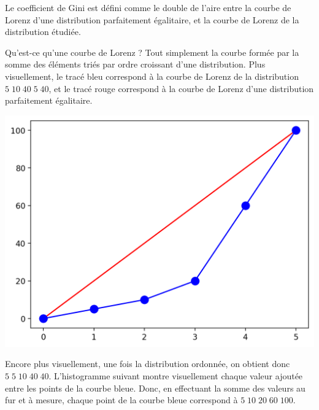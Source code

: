 \documentclass[11pt,a4paper]{article}
\begin{document}
\bigskip

Le coefficient de Gini est défini comme le double de l'aire entre la courbe de Lorenz d'une distribution parfaitement égalitaire, et la courbe de Lorenz de la distribution étudiée.

Qu'est-ce qu'une courbe de Lorenz ?
Tout simplement la courbe formée par la somme des éléments triés par ordre croissant d'une distribution.
Plus visuellement, le tracé bleu correspond à la courbe de Lorenz de la distribution $ 5 \; 10 \; 40 \; 5 \; 40 $, et le tracé rouge correspond à la courbe de Lorenz d'une distribution parfaitement égalitaire.

\bigskip

\begin{center}
\includegraphics[scale=0.60]{img/exemple_courbe_lorenz_simple.png}
\end{center}

\bigskip

Encore plus visuellement, une fois la distribution ordonnée, on obtient donc $ 5 \; 5 \; 10 \; 40 \; 40 $.
L'histogramme suivant montre visuellement chaque valeur ajoutée entre les points de la courbe bleue.
Donc, en effectuant la somme des valeurs au fur et à mesure, chaque point de la courbe bleue correspond à $ 5 \; 10 \; 20 \; 60 \; 100 $.

\bigskip
\end{document}
